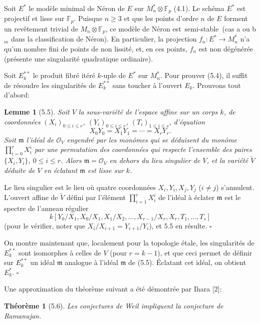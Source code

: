 \documentclass[10pt]{article}
\newcommand{\cO}{\mathcal O}
\newcommand{\QED}{\hfill$\square$}
\newcommand{\F}{\mathbb F}
\newcommand{\frquote}[1]{\guillemotleft{}\,#1\,\guillemotright{}}
\newtheorem*{theorem}{Théorème}
\newtheorem*{lemma}{Lemme}
\begin{document}
Soit $E^*$ le modèle minimal de Néron de $E$ sur $M_n^*\otimes\F_p$ (4.1). Le schéma $E^*$ est projectif et lisse sur $\F_p$. Puisque $n\ge3$ et que les points d'ordre $n$ de $E$ forment un revêtement trivial de $M_n\otimes\F_p$, ce modèle de Néron est \frquote{semi-stable} (cas a ou b$_m$ dans la classification de Néron). En particulier, la projection $f_n:E^*\to M_n^*$ n'a qu'un nombre fini de points de non lissité, et, en ces points, $f_n$ est non dégénérée (présente une singularité quadratique ordinaire).

Soit $E_k^{**}$ le produit fibré itéré $k$-uple de $E^*$ sur $M_n^*$. Pour prouver (5.4), il suffit de résoudre les singularités de $E_k^{**}$ sans toucher à l'ouvert $E_k$. Prouvons tout d'abord:

\begin{lemma}[5.5]
Soit $V$ la sous-variété de l'espace affine sur un corps $k$, de coordonnées $(X_i)_{0\le i\le r}$, $(Y_i)_{0\le i\le r}$, $(T_i)_{1\le i\le s}$, d'équation
\[
X_0Y_0=X_1Y_1=\cdots=X_rY_r.
\]
Soit $\mathfrak m$ l'idéal de $\cO_V$ engendré par les monômes qui se déduisent du monôme $\prod_{i=0}^rX_i^i$ par une permutation des coordonnées qui respecte l'ensemble des paires $\{X_i,Y_i\}$, $0\le i\le r$. Alors $\mathfrak m=\cO_V$ en dehors du lieu singulier de $V$, et la variété $\widetilde V$ déduite de $V$ en éclatant $\mathfrak m$ est lisse sur $k$.
\end{lemma}

Le lieu singulier est le lieu où quatre coordonnées $X_i,Y_i,X_j,Y_j$ ($i\ne j$) s'annulent. L'ouvert affine de $\widetilde V$ défini par l'élément $\prod_{i=1}^rX_i^i$ de l'idéal à éclater $\mathfrak m$ est le spectre de l'anneau régulier
\[
k[Y_0/X_1,X_0/X_1,X_1/X_2,\ldots,X_{r-1}/X_r,X_r,T_1,\ldots,T_s]
\]
(pour le vérifier, noter que $X_i/X_{i+1}=Y_{i+1}/Y_i$), et 5.5 en résulte. \QED

On montre maintenant que, localement pour la topologie étale, les singularités de $E_k^{**}$ sont isomorphes à celles de $V$ (pour $r=k-1$), et que ceci permet de définir sur $E_k^{**}$ un idéal $\mathfrak m$ analogue à l'idéal $\mathfrak m$ de (5.5). Éclatant cet idéal, on obtient $E_k^*$. \QED

Une approximation du théorème suivant a été démontrée par Ihara [2]:

\begin{theorem}[5.6]
Les conjectures de Weil impliquent la conjecture de Ramanujan.
\end{theorem}
\end{document}
